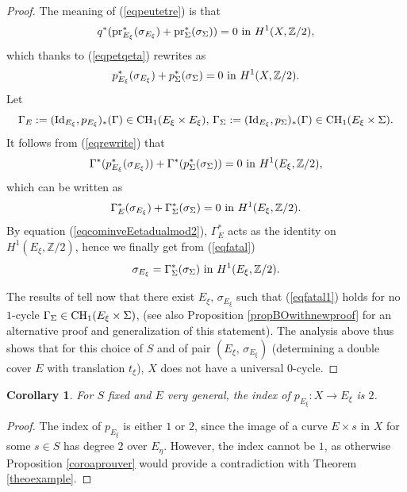 \documentclass[10pt]{article}
\newtheorem{coro}[theo]{Corollary}
\begin{document}
\begin{proof}
The meaning of (\ref{eqpeutetre}) is that
\begin{eqnarray}\label{eqpeutetremean}q^*({\rm pr}_{E_\xi}^*(\sigma_{E_\xi})+{\rm pr}_\Sigma^*(\sigma_\Sigma))=0\,\,{\rm in}\,\,H^1(X,\mathbb{Z}/2),\end{eqnarray}
which  thanks to (\ref{eqpetqeta}) rewrites as
\begin{eqnarray}\label{eqrewrite} p_{E_\xi}^*(\sigma_{E_\xi})+{p}_\Sigma^*(\sigma_\Sigma)=0\,\,{\rm in}\,\,H^1(X,\mathbb{Z}/2).
\end{eqnarray}
 Let $$\Gamma_E:=({\rm Id}_{E_\xi}, p_{E_\xi})_*(\Gamma)\in{\rm CH}_1(E_\xi\times E_\xi),\,\Gamma_\Sigma:=({\rm Id}_{E_\xi}, p_\Sigma)_*(\Gamma)\in {\rm CH}_1(E_\xi\times \Sigma).$$
 It follows from (\ref{eqrewrite}) that
 $$\Gamma^*(p_{E_\xi}^*(\sigma_{E_\xi}))+\Gamma^*({p}_\Sigma^*(\sigma_\Sigma))=0\,\,{\rm in}\,\,H^1(E_\xi,\mathbb{Z}/2),$$
 which can be written as
 \begin{eqnarray}\label{eqfatal}  \Gamma_E^*(\sigma_{E_\xi})+\Gamma_\Sigma^*(\sigma_\Sigma)=0\,\,{\rm in}\,\,H^1(E_\xi,\mathbb{Z}/2).
 \end{eqnarray}
 By equation (\ref{eqcominveEetadualmod2}),  $\Gamma_E^*$ acts as the identity on $H^1(E_\xi,\mathbb{Z}/2)$, hence
 we finally get from (\ref{eqfatal})
 \begin{eqnarray} \label{eqfatal1} \sigma_{E_\xi}=\Gamma_\Sigma^*(\sigma_\Sigma)\,\,{\rm in}\,\,H^1(E_\xi,\mathbb{Z}/2).
 \end{eqnarray}

 The  results of \cite[Propositions 1.1 and  2.1]{benoistOttem}  tell now that  there exist $E_\xi,\,\sigma_{E_\xi}$ such that (\ref{eqfatal1})  holds for no  $1$-cycle $\Gamma_\Sigma\in{\rm CH}_1(E_\xi\times \Sigma)$, (see also Proposition \ref{propBOwithnewproof} for  an alternative proof and generalization of this statement).
 The analysis above thus shows that for this choice of $S$ and of pair $(E_\xi,\,\sigma_{E_\xi})$ (determining a double cover $E$ with translation $t_\xi$), $X$ does not have a universal $0$-cycle.
\end{proof}
\begin{coro} \label{coroindex} For $S$ fixed and  $E$ very general, the index of $p_{E_\xi}: X\rightarrow E_\xi$ is $2$.
\end{coro}
\begin{proof} The index of $p_{E_\xi}$ is either $1$ or $2$, since the image of a curve $E\times s$ in $X$ for some $s\in S$ has degree $2$ over $E_\eta$. However, the index cannot be $1$, as  otherwise Proposition  \ref{coroaprouver} would provide a contradiction with  Theorem \ref{theoexample}.
\end{proof}
\end{document}
